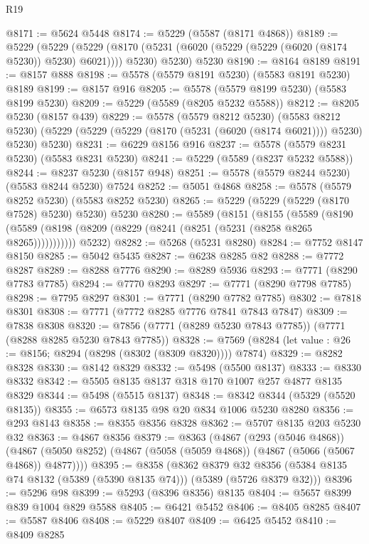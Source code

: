 \begin{lexlean}{R19}
\begin{coremodule}
@8171 := @5624 @5448
@8174 := @5229 (@5587 (@8171 @4868))
@8189 := @5229
    (@5229
      (@5229 (@8170 (@5231 (@6020 (@5229 (@5229 (@6020 (@8174 @5230)) @5230) @6021)))) @5230)
      @5230)
    @5230
@8190 := @8164 @8189
@8191 := @8157 @888
@8198 := @5578 (@5579 @8191 @5230) (@5583 @8191 @5230) @8189
@8199 := @8157 @916
@8205 := @5578 (@5579 @8199 @5230) (@5583 @8199 @5230)
@8209 := @5229 (@5589 (@8205 @5232 @5588))
@8212 := @8205 @5230 (@8157 @439)
@8229 := @5578
    (@5579 @8212 @5230)
    (@5583 @8212 @5230)
    (@5229 (@5229 (@5229 (@8170 (@5231 (@6020 (@8174 @6021)))) @5230) @5230) @5230)
@8231 := @6229 @8156 @916
@8237 := @5578 (@5579 @8231 @5230) (@5583 @8231 @5230)
@8241 := @5229 (@5589 (@8237 @5232 @5588))
@8244 := @8237 @5230 (@8157 @948)
@8251 := @5578 (@5579 @8244 @5230) (@5583 @8244 @5230) @7524
@8252 := @5051 @4868
@8258 := @5578 (@5579 @8252 @5230) (@5583 @8252 @5230)
@8265 := @5229 (@5229 (@5229 (@8170 @7528) @5230) @5230) @5230
@8280 := @5589
    (@8151
      (@8155
        (@5589 (@8190 (@5589 (@8198 (@8209 (@8229 (@8241 (@8251 (@5231 (@8258 @8265 @8265)))))))))))
      @5232)
@8282 := @5268 (@5231 @8280)
@8284 := @7752 @8147 @8150
@8285 := @5042 @5435
@8287 := @6238 @8285 @82
@8288 := @7772 @8287
@8289 := @8288 @7776
@8290 := @8289 @5936
@8293 := @7771 (@8290 @7783 @7785)
@8294 := @7770 @8293
@8297 := @7771 (@8290 @7798 @7785)
@8298 := @7795 @8297
@8301 := @7771 (@8290 @7782 @7785)
@8302 := @7818 @8301
@8308 := @7771 (@7772 @8285 @7776 @7841 @7843 @7847)
@8309 := @7838 @8308
@8320 := @7856 (@7771 (@8289 @5230 @7843 @7785)) (@7771 (@8288 @8285 @5230 @7843 @7785))
@8328 := @7569 (@8284 (let value : @26 := @8156; @8294 (@8298 (@8302 (@8309 @8320)))) @7874)
@8329 := @8282 @8328
@8330 := @8142 @8329
@8332 := @5498 (@5500 @8137)
@8333 := @8330 @8332
@8342 := @5505 @8135 @8137 @318 @170 @1007 @257 @4877 @8135 @8329
@8344 := @5498 (@5515 @8137)
@8348 := @8342 @8344 (@5329 (@5520 @8135))
@8355 := @6573 @8135 @98 @20 @834 @1006 @5230 @8280
@8356 := @293 @8143
@8358 := @8355 @8356 @8328
@8362 := @5707 @8135 @203 @5230 @32
@8363 := @4867 @8356
@8379 := @8363
    (@4867
      (@293 (@5046 @4868))
      (@4867 (@5050 @8252) (@4867 (@5058 (@5059 @4868)) (@4867 (@5066 (@5067 @4868)) @4877))))
@8395 := @8358
    (@8362
      @8379
      @32
      @8356
      (@5384 @8135 @74 @8132 (@5389 (@5390 @8135 @74)))
      (@5389 (@5726 @8379 @32)))
@8396 := @5296 @98
@8399 := @5293 (@8396 @8356) @8135
@8404 := @5657 @8399 @839 @1004 @829 @5588
@8405 := @6421 @5452
@8406 := @8405 @8285
@8407 := @5587 @8406
@8408 := @5229 @8407
@8409 := @6425 @5452
@8410 := @8409 @8285

\end{coremodule}
\end{lexlean}

